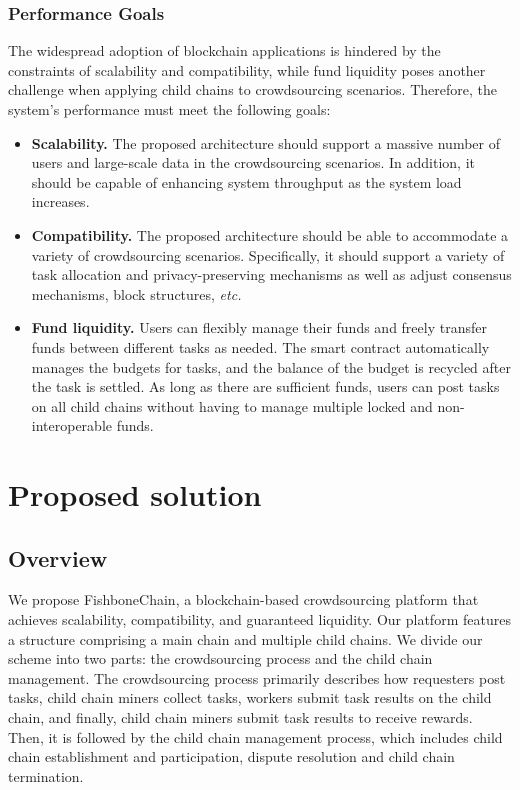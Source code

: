 \documentclass[10pt,journal]{IEEEtran}
\begin{document}
\subsubsection{\textbf{Performance Goals}}

The widespread adoption of blockchain applications is hindered by the constraints of scalability and compatibility, while fund liquidity poses another challenge when applying child chains to crowdsourcing scenarios. 
{\color{blue} 
Therefore, the system's performance must meet the following goals:
}%

\begin{itemize}
    \item \textbf{Scalability.}
          The proposed architecture should support a massive number of users and large-scale data in the crowdsourcing scenarios. In addition, it should be capable of enhancing system throughput as the system load increases.
    \item \textbf{Compatibility.}
          The proposed architecture should be able to accommodate a variety of crowdsourcing scenarios. Specifically, it should support a variety of task allocation and privacy-preserving mechanisms as well as adjust consensus mechanisms, block structures, \textit{etc.}
    \item \textbf{Fund liquidity.}
          Users can flexibly manage their funds and freely transfer funds between different tasks as needed. The smart contract automatically manages the budgets for tasks, and the balance of the budget is recycled after the task is settled. As long as there are sufficient funds, users can post tasks on all child chains without having to manage multiple locked and non-interoperable funds.
\end{itemize}


\section{Proposed solution}\label{section:solution}

\subsection{Overview} \label{subsec:overview}

We propose FishboneChain, a blockchain-based crowdsourcing platform that achieves scalability, compatibility, and guaranteed liquidity. Our platform features a structure comprising a main chain and multiple child chains. We divide our scheme into two parts: the crowdsourcing process and the child chain management. The crowdsourcing process primarily describes how requesters post tasks, child chain miners collect tasks, workers submit task results on the child chain, and finally, child chain miners submit task results to receive rewards. Then, it is followed by the child chain management process, which includes child chain establishment and participation, dispute resolution and child chain termination.
\end{document}
